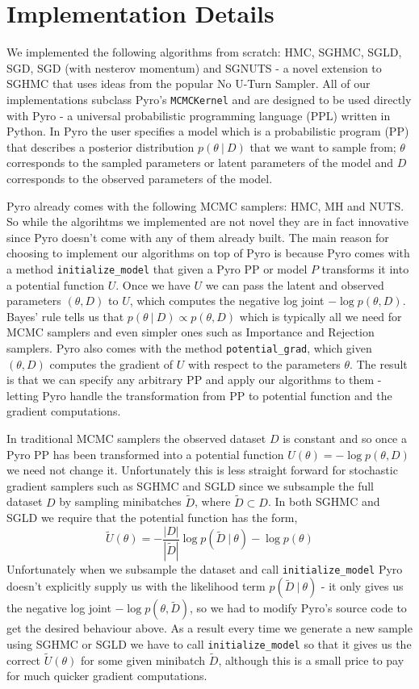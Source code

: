 
\section{Implementation Details}

We implemented the following algorithms from scratch: HMC, SGHMC, SGLD, SGD, SGD (with nesterov momentum) and SGNUTS - a novel extension to SGHMC that uses ideas from the popular No U-Turn Sampler.  All of our implementations subclass Pyro's \texttt{MCMCKernel} and are designed to be used directly with Pyro - a universal probabilistic programming language (PPL) written in Python. In Pyro the user specifies a model which is a probabilistic program (PP) that describes a posterior distribution $p(\theta \: | \: D)$ that we want to sample from; $\theta$ corresponds to the sampled parameters or latent parameters of the model and $D$ corresponds to the observed parameters of the model. 

Pyro already comes with the following MCMC samplers: HMC, MH and NUTS. So while the algorihtms we implemented are not novel they are in fact innovative since Pyro doesn't come with any of them already built. The main reason for choosing to implement our algorithms on top of Pyro is because Pyro comes with a method \texttt{initialize\_model} that given a Pyro PP or model $P$ transforms it into a potential function $U$. Once we have $U$ we can pass the latent and observed parameters $(\theta, D)$ to $U$, which computes the negative log joint $- \log p(\theta, D)$. Bayes' rule tells us that  $p(\theta \: | \: D) \propto p(\theta, D)$ which is typically all we need for MCMC samplers and even simpler ones such as Importance and Rejection samplers. Pyro also comes with the method \texttt{potential\_grad}, which given $(\theta, D)$ computes the gradient of $U$ with respect to the parameters $\theta$. The result is that we can specify any arbitrary PP and apply our algorithms to them - letting Pyro handle the transformation from PP to potential function and the gradient computations.

In traditional MCMC samplers the observed dataset $D$ is constant and so once a Pyro PP has been transformed into a potential function $U(\theta) = - \log p(\theta, D)$ we need not change it. Unfortunately this is less straight forward for stochastic gradient samplers such as SGHMC and SGLD since we subsample the full dataset $D$ by sampling minibatches $\tilde{D}$, where $\tilde{D} \subset D$. In both SGHMC and SGLD we require that the potential function has the form,
$$\tilde{U}(\theta) =  -\frac{|D|}{|\tilde{D}|} \log p(\tilde{D} \: | \: \theta) - \log p (\theta)$$
Unfortunately when we subsample the dataset and call \texttt{initialize\_model} Pyro doesn't explicitly supply us with the likelihood term $p(\tilde{D} \: | \: \theta)$ - it only gives us the negative log joint $- \log p(\theta, \tilde{D})$, so we had to modify Pyro's source code to get the desired behaviour above. As a result every time we generate a new sample using SGHMC or SGLD we have to call \texttt{initialize\_model} so that it gives us the correct $\tilde{U}(\theta)$ for some given minibatch $\tilde{D}$, although this is a small price to pay for much quicker gradient computations.